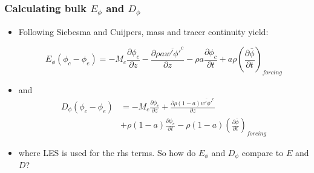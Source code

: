 \documentclass[fleqn,hyperref={colorlinks=true,linkcolor=blue,urlcolor=blue},numbers]{beamer}
\begin{document}
\begin{frame}
  \frametitle{Calculating bulk $E_\phi$ and $D_\phi$}

  \begin{itemize}
  \item Following Siebesma and Cuijpers, mass and tracer continuity yield:

\begin{equation*}
  \label{eq:siebesma_entrainment}
    E_{\phi}(\phi_c - \phi_e) = - M_c \frac{\partial \phi_c}{\partial z}
        - \frac{\partial \rho a \overline{w' \phi'}^c}{\partial z}
        - \rho a \frac{\partial \phi_c}{\partial t}
        + a \rho \left(\frac{\partial \bar{\phi}}{\partial t}\right)_{forcing}
\end{equation*} \pause

\item and
\begin{align*}
  \label{eq:siebesma_detrainment}
    D_{\phi}(\phi_c - \phi_e) &= - M_c \frac{\partial \phi_e}{\partial z}
        + \frac{\partial \rho (1 - a) \overline{w' \phi'}^e}{\partial z}
        \\
& + \rho (1-a) \frac{\partial \phi_e}{\partial t}
     - \rho (1-a) \left(\frac{\partial \bar{\phi}}{\partial t}\right)_{forcing}
\end{align*} \pause

\item where LES is used for the rhs terms.  So how do $E_\phi$ and $D_\phi$ compare to $E$ and $D$?

  \end{itemize}

\end{frame}
\end{document}
